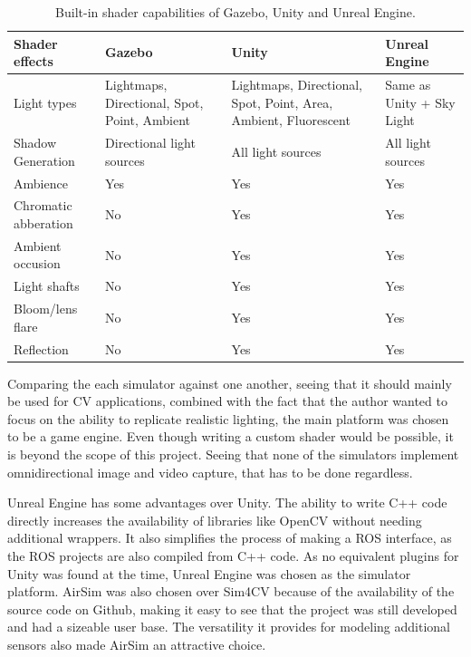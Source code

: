 \begin{table}[!htb]
    \centering
    \caption{Built-in shader capabilities of Gazebo, Unity and Unreal Engine.}
    \label{tab:comparison_shader}
    \begin{tabular}{|>{\centering\arraybackslash}m{3cm}|>{\centering\arraybackslash}m{3.5cm}|>{\centering\arraybackslash}m{4cm}|>{\centering\arraybackslash}m{3.5cm}|} \hline
        \textbf{Shader effects} & \textbf{Gazebo} & \textbf{Unity} & \textbf{Unreal Engine} \\ \hline\hline
        Light types     & Lightmaps, Directional, Spot, Point, Ambient & Lightmaps, Directional, Spot, Point, Area, Ambient, Fluorescent & Same as Unity + Sky Light \\ \hline
        Shadow Generation & Directional light sources & All light sources & All light sources \\ \hline
        Ambience        & Yes & Yes & Yes \\ \hline
        Chromatic abberation & No & Yes & Yes \\ \hline
        Ambient occusion & No & Yes & Yes \\ \hline
        Light shafts    & No & Yes & Yes \\ \hline
        Bloom/lens flare & No & Yes & Yes \\ \hline
        Reflection      & No & Yes & Yes \\ \hline
    \end{tabular}
\end{table}

Comparing the each simulator against one another, seeing that it should mainly be used for CV applications, combined with the fact that the author wanted to focus on the ability to replicate realistic lighting, the main platform was chosen to be a game engine. Even though writing a custom shader would be possible, it is beyond the scope of this project. Seeing that none of the simulators implement omnidirectional image and video capture, that has to be done regardless.

Unreal Engine has some advantages over Unity. The ability to write C++ code directly increases the availability of libraries like OpenCV without needing additional wrappers. It also simplifies the process of making a ROS interface, as the ROS projects are also compiled from C++ code. As no equivalent plugins for Unity was found at the time, Unreal Engine was chosen as the simulator platform. AirSim was also chosen over Sim4CV because of the availability of the source code on Github, making it easy to see that the project was still developed and had a sizeable user base. The versatility it provides for modeling additional sensors also made AirSim an attractive choice.


